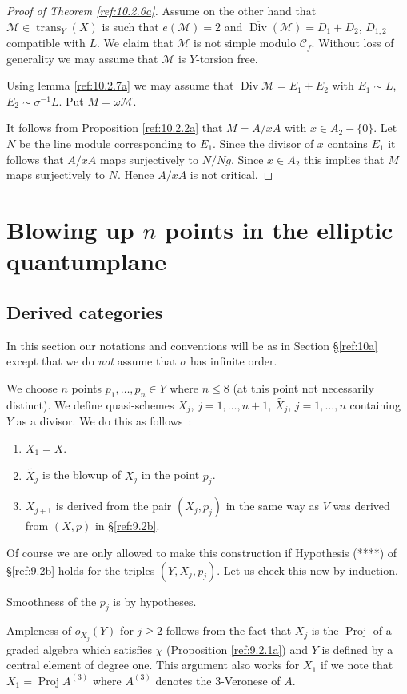 \documentclass{amsproc}
\def\Cscr{{\mathcal C}}
\def\Mscr{{\mathcal M}}
\def\trans{\operatorname{trans}}
\def\Div{\operatorname{Div}}
\def\Proj{\operatorname {Proj}}
\theoremstyle{definition}
\theoremstyle{remark}
\numberwithin{equation}{section}
\numberwithin{table}{section}
\numberwithin{figure}{section}
\begin{document}
\begin{proof}[Proof of Theorem \ref{ref:10.2.6a}]
Assume on the other hand that $\Mscr\in\trans_Y(X)$ is such that
$e(\Mscr)=2$ and $\overline{\Div}(\Mscr)=D_1+D_2$, $D_{1,2}$ compatible
with $L$. We claim that $\Mscr$ is not simple modulo
$\Cscr_f$. Without loss of generality we may assume that $\Mscr$ is
$Y$-torsion free.

Using lemma \ref{ref:10.2.7a} we may assume that $\Div \Mscr=E_1+E_2$
with $E_1\sim L$, $E_2\sim \sigma^{-1}L$. 
 Put $M=\omega\Mscr$.   

It follows from 
 Proposition \ref{ref:10.2.2a} that $M=A/xA$ with $x\in A_2-\{0\}$. Let $N$ be
 the line module corresponding to $E_1$. Since the divisor of $x$
 contains $E_1$ it follows that $A/xA$ maps surjectively to
 $N/Ng$.  Since $x\in A_2$ this implies
 that $M$ maps surjectively to $N$. Hence $A/xA$ is not critical.
\end{proof}
\section{Blowing up $n$ points in the elliptic
quantumplane}
\label{ref:11a} 
\subsection{Derived categories}
\label{ref:11.1a}In this section our notations and conventions will be as in Section
\S\ref{ref:10a} except that  we
do \emph{not} assume that $\sigma$ has infinite order.

We choose $n$   points $p_1,\ldots,p_n\in Y$ where $n\le 8$ (at this
point not necessarily distinct). We
define quasi-schemes $X_j$, $j=1,\ldots,n+1$, $\tilde{X_j}$,
$j=1,\ldots,n$ 
containing $Y$ as a divisor. We do this as follows~:
\begin{enumerate}
\item $X_1=X$.
\item $\tilde{X_j}$ is the blowup of $X_j$ in the point $p_j$.
\item $X_{j+1}$ is derived from the pair $(X_j,p_j)$ in the same way
  as $V$ was derived from $(X,p)$ in \S\ref{ref:9.2b}.
\end{enumerate}
Of course we are only allowed to make this construction if Hypothesis
(****) of \S \ref{ref:9.2b} holds for the triples $(Y,X_j,p_j)$. Let us
check this now by induction.

Smoothness of the $p_j$ is by hypotheses.

Ampleness of $o_{X_j}(Y)$ for $j\ge 2$ follows from the fact that
$X_j$ is the $\Proj$ of a graded algebra which satisfies $\chi$
(Proposition \ref{ref:9.2.1a}) and $Y$ is defined by a central element
of degree one. This argument also works for $X_1$ if we note that
$X_1=\Proj A^{(3)}$ where $A^{(3)}$ denotes the $3$-Veronese of $A$.
\end{document}
